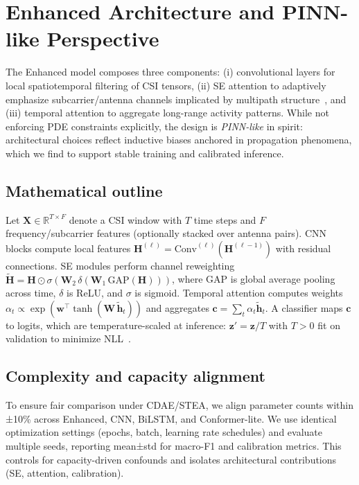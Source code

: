 \documentclass[journal]{IEEEtran}
\begin{document}
\section{Enhanced Architecture and PINN-like Perspective}
The Enhanced model composes three components: (i) convolutional layers for local spatiotemporal filtering of CSI tensors, (ii) SE attention to adaptively emphasize subcarrier/antenna channels implicated by multipath structure~\cite{se_networks2018}, and (iii) temporal attention to aggregate long-range activity patterns. While not enforcing PDE constraints explicitly, the design is \emph{PINN-like} in spirit: architectural choices reflect inductive biases anchored in propagation phenomena, which we find to support stable training and calibrated inference.

\subsection{Mathematical outline}
Let $\mathbf{X}\in \mathbb{R}^{T\times F}$ denote a CSI window with $T$ time steps and $F$ frequency/subcarrier features (optionally stacked over antenna pairs). CNN blocks compute local features $\mathbf{H}^{(\ell)} = \mathrm{Conv}^{(\ell)}(\mathbf{H}^{(\ell-1)})$ with residual connections. SE modules perform channel reweighting $\tilde{\mathbf{H}} = \mathbf{H}\odot \sigma(\mathbf{W}_2\,\delta(\mathbf{W}_1\,\mathrm{GAP}(\mathbf{H})))$, where GAP is global average pooling across time, $\delta$ is ReLU, and $\sigma$ is sigmoid. Temporal attention computes weights $\alpha_t \propto \exp(\mathbf{w}^\top \tanh(\mathbf{W}\,\tilde{\mathbf{h}}_t))$ and aggregates $\mathbf{c}=\sum_t \alpha_t\tilde{\mathbf{h}}_t$. A classifier maps $\mathbf{c}$ to logits, which are temperature-scaled at inference: $\mathbf{z}'=\mathbf{z}/T$ with $T>0$ fit on validation to minimize NLL~\cite{calibration_guo2017}.

\subsection{Complexity and capacity alignment}
To ensure fair comparison under CDAE/STEA, we align parameter counts within ±10\% across Enhanced, CNN, BiLSTM, and Conformer-lite. We use identical optimization settings (epochs, batch, learning rate schedules) and evaluate multiple seeds, reporting mean±std for macro-F1 and calibration metrics. This controls for capacity-driven confounds and isolates architectural contributions (SE, attention, calibration).
\end{document}
